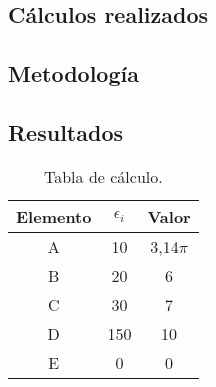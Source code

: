 \begin{anexo}
	
\chapter{Cálculos realizados}

	\section{Metodología}
		\lipsum[1-2]


	\section{Resultados}
		\lipsum[10]

		\enabletablerowcolor[2] %
		\begin{table}[htbp]
			\centering
			\caption{Tabla de cálculo.}
			\begin{tabular}{ccc}
				\hline
				\textbf{Elemento} & $\epsilon_i$ & \boldmath{}\textbf{Valor}\unboldmath{} \bigstrut\\
				\hline
				A     & 10    & 3,14$\pi$ \bigstrut[t]\\
				B     & 20    & 6 \\
				C     & 30    & 7 \\
				D     & 150    & 10 \\
				E     & 0    & 0 \\
				\hline
				\end{tabular}
			\label{tab:anexo-1}
		\end{table}
		\disabletablerowcolor %

\end{anexo}